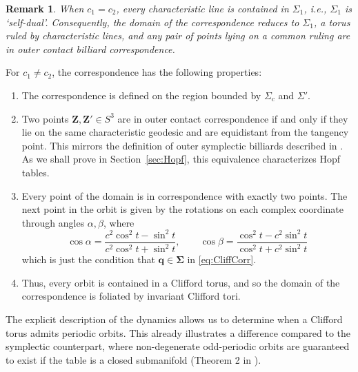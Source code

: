 \documentclass{article}
\newtheorem{rmk}{Remark}
\begin{document}
\begin{rmk}
When $c_1=c_2$, every characteristic line is contained in $\Sigma_1$, i.e., $\Sigma_1$ is `self-dual'. Consequently, the 
domain of the correspondence reduces to $\Sigma_1$, a torus ruled by characteristic lines, and any pair of points lying on a common ruling are in outer 
contact billiard correspondence.    
\end{rmk}

For $c_1 \neq c_2$, the correspondence has the following properties:
\begin{enumerate}
    \item The correspondence is defined on the region bounded by $\Sigma_c$ and $\Sigma'$.
    \item Two points $\boldsymbol{Z}, \boldsymbol{Z'} \in S^3$ are in outer contact 
    correspondence if and only if they lie on the same characteristic geodesic and are 
    equidistant from the tangency point. This mirrors the definition of outer symplectic 
    billiards described in \cite{tabachnikov1995dual}. As we shall prove in 
    Section~\ref{sec:Hopf}, this equivalence characterizes Hopf tables.
    \item Every point of the domain is in correspondence with exactly two points. The next 
    point in the orbit is given by the rotations on each complex coordinate through angles 
    $\alpha,\beta$, where
    \begin{equation}\label{eq:CTorAngles}
        \cos\alpha = \frac{c^2\cos^2 t - \sin^2 t}{c^2 \cos^2t +  \sin^2 t}, \qquad \cos\beta = \frac{\cos^2 t - c^2\sin^2 t}{ \cos^2t + c^2 \sin^2 t}
    \end{equation} 
    which is just the condition that $\boldsymbol{q}\in \boldsymbol{\Sigma}$ in \eqref{eq:CliffCorr}.

    \item Thus, every orbit is contained in a Clifford torus, and so the domain of the 
    correspondence is foliated by invariant Clifford tori.
    \end{enumerate}

The explicit description of the dynamics allows us to determine when a Clifford torus admits periodic orbits. This already illustrates a difference compared to the symplectic counterpart, where non-degenerate odd-periodic orbits are guaranteed to exist if the table is a closed submanifold (Theorem 2 in \cite{albers2024outer}).
\end{document}
